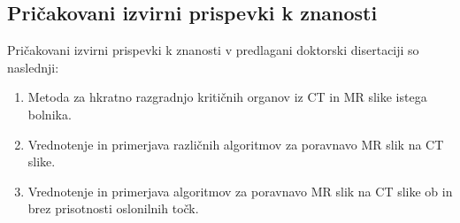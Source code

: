 \documentclass[a4paper,twoside,11pt]{article}
\begin{document}
	  
	
	\subsubsection*{}
	\par{}
	\subsection{Pričakovani izvirni prispevki k znanosti}
	\par{\noindent
		Pričakovani izvirni prispevki k znanosti v predlagani doktorski disertaciji so naslednji:
		\begin{enumerate}
			\item Metoda za hkratno razgradnjo kritičnih organov iz CT in MR slike istega bolnika.
			\item Vrednotenje in primerjava različnih algoritmov za poravnavo MR slik na CT slike.
			\item Vrednotenje in primerjava algoritmov za poravnavo MR slik na CT slike ob in brez prisotnosti oslonilnih točk.

		\end{enumerate}
	}
\end{document}
